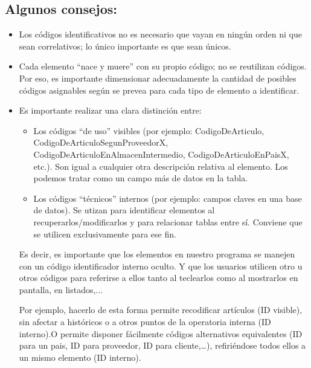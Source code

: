 \documentclass[spanish,12pt,a4paper,final,oneside]{book}
\begin{document}
\subsection{Algunos consejos:}
\begin{itemize}

\item Los códigos identificativos no es necesario que vayan en ningún orden ni que sean correlativos; lo único importante es que sean únicos.

\item Cada elemento ``nace y muere'' con su propio código; no se reutilizan códigos. Por eso, es importante dimensionar adecuadamente la cantidad de posibles códigos asignables según se prevea para cada tipo de elemento a identificar.


\item Es importante realizar una clara distinción entre:

\begin{itemize}

\item Los códigos ``de uso'' visibles (por ejemplo: CodigoDeArticulo, CodigoDeArticuloSegunProveedorX, CodigoDeArticuloEnAlmacenIntermedio, CodigoDeArticuloEnPaisX, etc.). Son igual a cualquier otra descripción relativa al elemento. Los podemos tratar como un campo más de datos en la tabla.

\item Los códigos ``técnicos'' internos (por ejemplo: campos claves en una base de datos). Se utizan para identificar elementos al recuperarlos/modificarlos y para relacionar tablas entre sí. Conviene que se utilicen exclusivamente para ese fin.

\end{itemize}

Es decir, es importante que los elementos en nuestro programa se manejen con un código identificador interno oculto. Y que los usuarios utilicen otro u otros códigos para referirse a ellos tanto al teclearlos como al mostrarlos en pantalla, en listados,...

Por ejemplo, hacerlo de esta forma permite recodificar artículos (ID visible), sin afectar a históricos o a otros puntos de la operatoria interna (ID interno).O permite disponer fácilmente códigos alternativos equivalentes (ID para un pais, ID para proveedor, ID para cliente,\ldots), refiriéndose todos ellos a un mismo elemento (ID interno).

\end{itemize}
\end{document}
